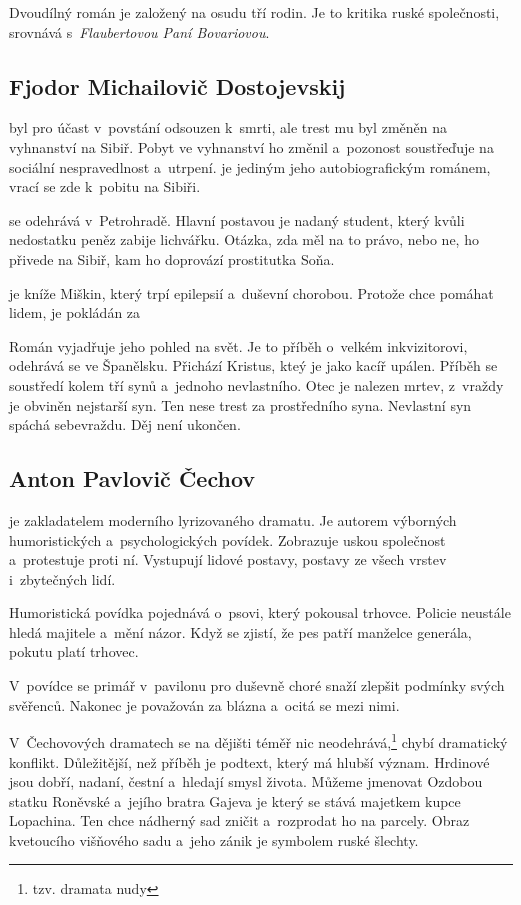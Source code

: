 Dvoudílný román  je založený na osudu tří rodin.
Je to kritika ruské společnosti, srovnává s~\emph{Flaubertovou Paní Bovariovou}.

\subsection*{Fjodor Michailovič Dostojevskij}
 byl pro účast v~povstání odsouzen
k~smrti, ale trest mu byl změněn na vyhnanství na Sibiř. Pobyt ve vyhnanství
ho změnil a~pozonost soustřeďuje na sociální nespravedlnost a~utrpení.
 je jediným jeho autobiografickým románem,
vrací se zde k~pobitu na Sibiři.

 se odehrává v~Petrohradě. Hlavní postavou je nadaný
student, který kvůli nedostatku peněz zabije lichvářku. Otázka, zda
měl na to právo, nebo ne, ho přivede na Sibiř, kam ho doprovází
prostitutka Soňa.

 je kníže Miškin, který trpí epilepsií a~duševní chorobou.
Protože chce pomáhat lidem, je pokládán za 

Román  vyjadřuje jeho pohled na svět. Je to
příběh o~velkém inkvizitorovi, odehrává se ve Španělsku. Přichází
Kristus, kteý je jako kacíř upálen. Příběh se soustředí kolem tří synů
a~jednoho nevlastního. Otec je nalezen mrtev, z~vraždy je obviněn
nejstarší syn. Ten nese trest za prostředního syna. Nevlastní syn spáchá
sebevraždu. Děj není ukončen.

\subsection*{Anton Pavlovič Čechov}
 je zakladatelem moderního lyrizovaného
dramatu. Je autorem výborných humoristických a~psychologických povídek.
Zobrazuje uskou společnost a~protestuje proti ní. Vystupují lidové
postavy, postavy ze všech vrstev i~zbytečných lidí.

Humoristická povídka  pojednává o~psovi, který pokousal
trhovce. Policie neustále hledá majitele a~mění názor. Když se zjistí,
že pes patří manželce generála, pokutu platí trhovec.

V~povídce  se primář v~pavilonu pro duševně choré
snaží zlepšit podmínky svých svěřenců. Nakonec je považován za blázna
a~ocitá se mezi nimi.

V~Čechovových dramatech se na dějišti téměř nic
neodehrává,\footnote{tzv. dramata nudy} chybí dramatický konflikt.
Důležitější, než příběh je podtext, který má hlubší význam. Hrdinové
jsou dobří, nadaní, čestní a~hledají smysl života. Můžeme jmenovat
  Ozdobou statku Roněvské a~jejího
bratra Gajeva je  který se stává majetkem kupce
Lopachina. Ten chce nádherný sad zničit a~rozprodat ho na parcely. 
Obraz kvetoucího višňového sadu a~jeho zánik je symbolem ruské šlechty.

